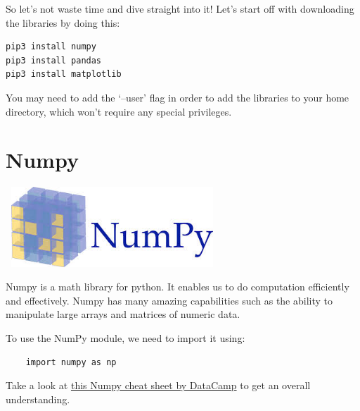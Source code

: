 \documentclass{42-en}
\begin{document}
\raggedright{
So let’s not waste time and dive straight into it! Let’s start off with downloading the libraries by doing this:
}

\vspace{1em}
\begin{lstlisting}
pip3 install numpy
pip3 install pandas
pip3 install matplotlib
\end{lstlisting}

\vspace{1em}

You may need to add the ‘--user’ flag in order to add the libraries to your home directory, which won’t require any special privileges.\linebreak \linebreak

\chapter{Numpy}

\vspace{2em}

\includegraphics[width=80mm, height=30mm]{images/numpy.jpeg}

\vspace{1em}

\raggedright{Numpy is a math library for python. It enables us to do computation efficiently and effectively. Numpy has many amazing capabilities such as the ability to manipulate large arrays and matrices of numeric data.\linebreak

To use the NumPy module, we need to import it using:\linebreak

\begin{lstlisting}
    import numpy as np
\end{lstlisting}

\vspace{1em}
Take a look at \href{https://s3.amazonaws.com/assets.datacamp.com/blog_assets/Numpy_Python_Cheat_Sheet.pdf}{this Numpy cheat sheet by DataCamp} to get an overall understanding.}

\startexercices
\end{document}
